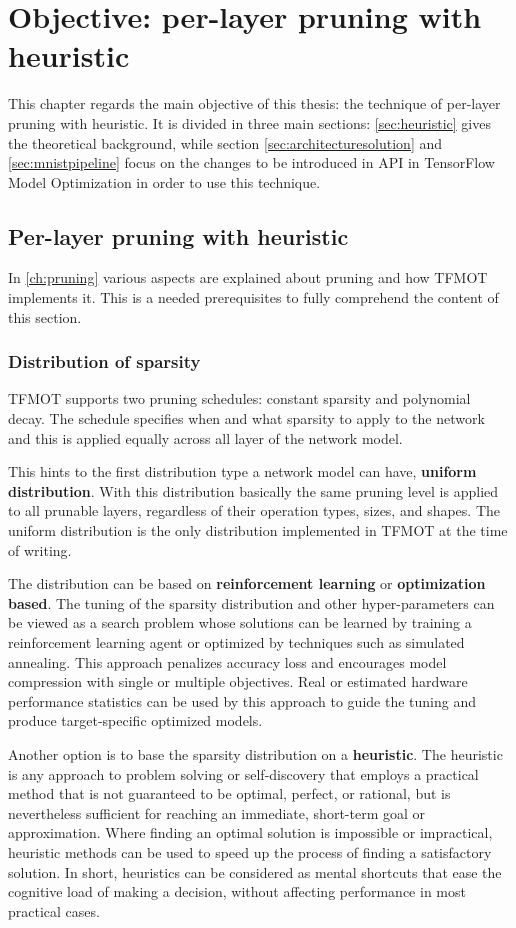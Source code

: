 \chapter{Objective: per-layer pruning with heuristic}\label{ch:objective}
This chapter regards the main objective of this thesis: the technique of
per-layer pruning with heuristic. It is divided in three main sections:
\autoref{sec:heuristic} gives the theoretical background, while section
\autoref{sec:architecturesolution} and \autoref{sec:mnistpipeline} focus on the
changes to be introduced in API in TensorFlow Model Optimization in order to
use this technique.

\section{Per-layer pruning with heuristic}\label{sec:heuristic}
In \autoref{ch:pruning} various aspects are explained about pruning and how
TFMOT implements it. This is a needed prerequisites to fully comprehend the
content of this section.

\subsection{Distribution of sparsity}
TFMOT supports two pruning schedules: constant sparsity and polynomial decay.
The schedule specifies when and what sparsity to apply to the network and this
is applied equally across all layer of the network model.

This hints to the first distribution type a network model can have,
\textbf{uniform distribution}. With this distribution basically the same
pruning level is applied to all prunable layers, regardless of their operation
types, sizes, and shapes.
The uniform distribution is the only distribution implemented in TFMOT at the
time of writing.

The distribution can be based on \textbf{reinforcement learning} or
\textbf{optimization based}. The tuning of the sparsity distribution and other
hyper-parameters can be viewed as a search problem whose solutions can be
learned\cite{He_2018} by training a reinforcement learning agent or optimized
by techniques such as simulated annealing. This approach penalizes accuracy
loss and encourages model compression with single or multiple objectives.
Real or estimated hardware performance statistics can be used by this approach
to guide the tuning and produce target-specific optimized models.

Another option is to base the sparsity distribution on a \textbf{heuristic}.
The heuristic is any approach to problem solving or self-discovery that employs
a practical method that is not guaranteed to be optimal, perfect, or rational,
but is nevertheless sufficient for reaching an immediate, short-term goal or
approximation.
Where finding an optimal solution is impossible or impractical, heuristic
methods can be used to speed up the process of finding a satisfactory solution.
In short, heuristics can be considered as mental shortcuts that ease the
cognitive load of making a decision, without affecting performance in most
practical cases.\cite{heuristic}


